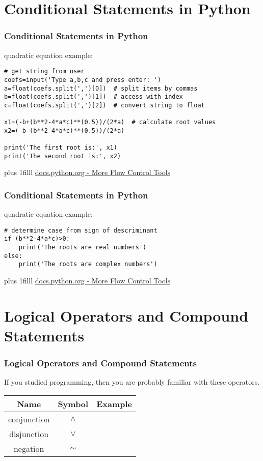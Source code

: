 \documentclass[fleqn]{beamer} %
\newcommand{\sectiontitleIV}{Conditional Statements in Python}
\newcommand{\sectiontitleV}{Logical Operators and Compound Statements}
\newcommand{\btVFill}{\vskip0pt plus 1filll}
\begin{document}
\section{\sectiontitleIV}	
\begin{frame}[label=sectionIV,containsverbatim] \small
\frametitle{\sectiontitleIV}    
quadratic equation example:
\begin{lstlisting}
# get string from user
coefs=input('Type a,b,c and press enter: ')  
a=float(coefs.split(',')[0])  # split items by commas 
b=float(coefs.split(',')[1])  # access with index
c=float(coefs.split(',')[2])  # convert string to float  

x1=(-b+(b**2-4*a*c)**(0.5))/(2*a)  # calculate root values
x2=(-b-(b**2-4*a*c)**(0.5))/(2*a)

print('The first root is:', x1)
print('The second root is:', x2)
\end{lstlisting}

\btVFill
{\tiny \href{https://docs.python.org/3/tutorial/controlflow.html}{docs.python.org - More Flow Control Tools}}

\end{frame}

\begin{frame}[label=sectionIV,containsverbatim] \small
\frametitle{\sectiontitleIV}    
quadratic equation example:
\begin{lstlisting}
# determine case from sign of descriminant
if (b**2-4*a*c)>0:
	print('The roots are real numbers')
else:
	print('The roots are complex numbers')
\end{lstlisting}

\btVFill
{\tiny \href{https://docs.python.org/3/tutorial/controlflow.html}{docs.python.org - More Flow Control Tools}}

\end{frame}

\section{\sectiontitleV}	
	\begin{frame}[label=sectionV,containsverbatim] \small
	\frametitle{\sectiontitleV}    
	
	If you studied programming, then you are probably familiar with these operators.  \vspace{5mm}\\
	
	\renewcommand*{\arraystretch}{1.5}
	\begin{tabular}{c|c|c} 
		Name&Symbol&Example\\ \hline
		conjunction&$\wedge$ & \\ \hline
		disjunction&$\vee$ & \\ \hline
		negation&$\sim$& \\ \hline

	\end{tabular}

	\end{frame}
	
\end{document}
